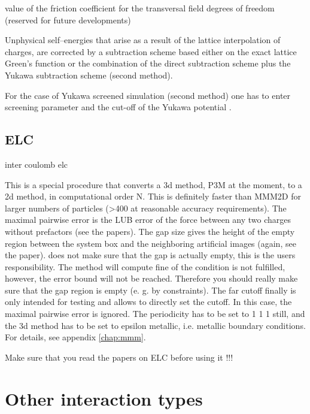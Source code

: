  value of the friction coefficient for the
transversal field degrees of freedom (reserved for future
developments)

Unphysical self--energies that arise as a result of the lattice
interpolation of charges, are corrected by a subtraction scheme based
either on the exact lattice Green's function or the combination of the
direct subtraction scheme plus the Yukawa subtraction scheme (second
method).

For the case of Yukawa screened simulation (second method) one has to
enter screening parameter  and the cut-off of the Yukawa
potential .

\subsection{ELC}

\begin{essyntax}
  inter coulomb elc  
\end{essyntax}
This is a special procedure that converts a 3d method, \ie P3M at the
moment, to a 2d method, in computational order N. This is definitely
faster than MMM2D for larger numbers of particles (>400 at reasonable
accuracy requirements). The maximal pairwise error is the LUB error of
the force between any two charges without prefactors (see the papers).
The gap size gives the height of the empty region between the system
box and the neighboring artificial images (again, see the paper).
\es{} does not make sure that the gap is actually empty, this is the
users responsibility. The method will compute fine of the condition is
not fulfilled, however, the error bound will not be reached. Therefore
you should really make sure that the gap region is empty (e. g. by
constraints). The far cutoff finally is only intended for testing and
allows to directly set the cutoff. In this case, the maximal pairwise
error is ignored. The periodicity has to be set to 1 1 1 still, and
the 3d method has to be set to epsilon metallic, i.e.  metallic
boundary conditions. For details, see appendix \vref{chap:mmm}.

Make sure that you read the papers on ELC before using it !!!

\section{Other interaction types}
\label{sec:inter-other}

